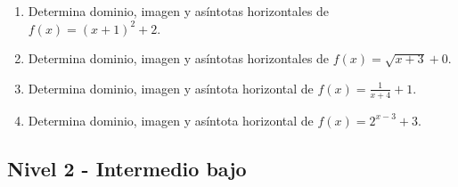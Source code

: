 \documentclass[11pt,a4paper]{article}
\begin{document}
\begin{enumerate}[label=\textbf{E\arabic*.},start=1]
\item Determina dominio, imagen y asíntotas horizontales de $f(x)=(x+1)^2+2$.

\item Determina dominio, imagen y asíntotas horizontales de $f(x)=\sqrt{x+3}+0$.

\item Determina dominio, imagen y asíntota horizontal de $f(x)=\frac{1}{x+4}+1$.

\item Determina dominio, imagen y asíntota horizontal de $f(x)=2^{x-3}+3$.

\end{enumerate}

\subsection{Nivel 2 - Intermedio bajo}
\end{document}
